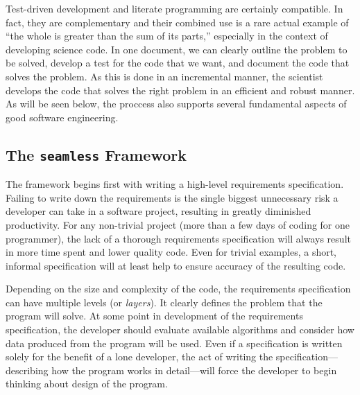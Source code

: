 Test-driven development and literate programming are certainly compatible.  In fact, they are 
complementary and their combined use is a rare actual example of ``the whole is greater
than the sum of its parts,'' especially in the context of developing science code.  
In one document, we can clearly outline the problem to be solved, develop a test for the 
code that we want, and document the code that solves the problem. As this is done in an incremental
manner, the scientist develops the code that solves the right problem in an efficient and robust manner.
As will be seen below, the proccess also supports several fundamental aspects of good software
engineering.

\subsection{The \texttt{seamless} Framework}\label{tdd-better}

The \seamless framework begins first with writing a high-level requirements specification.
Failing to write down the requirements is the single biggest unnecessary risk a developer
can take in a software project, resulting in greatly diminished productivity. 
For any non-trivial project (more than a few days of coding for one programmer), 
the lack of a thorough requirements specification will always result in more time spent and lower quality code.
Even for trivial examples, a short, informal specification will at least help to ensure
accuracy of the resulting code.

Depending on the size and complexity of the code, the requirements specification can have
multiple levels (or \textit{layers}). 
It clearly defines the problem that the program will solve. 
At some point in development of the requirements specification,
the developer should evaluate available algorithms and consider how data produced from the 
program will be used.
Even if a specification is written solely for the benefit of a lone developer, the act of 
writing the specification---describing how the program works in 
detail---will force the developer to begin thinking about design of the program.

